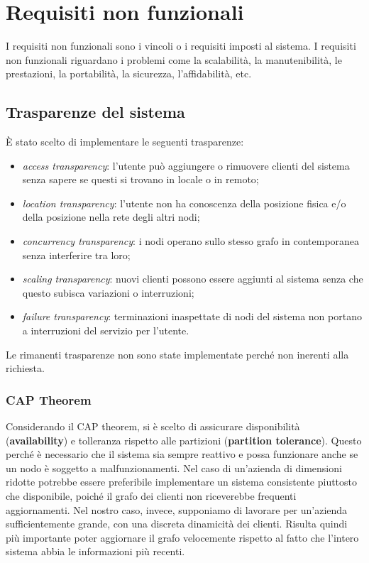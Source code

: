 \section{Requisiti non funzionali}\label{sec:non_functional}
I requisiti non funzionali sono i vincoli o i requisiti imposti al sistema. 
I requisiti non funzionali riguardano i problemi come la scalabilità, la manutenibilità, le prestazioni, la portabilità, la sicurezza, l'affidabilità, etc.

\subsection{Trasparenze del sistema}\label{sec:tra}
È stato scelto di implementare le seguenti trasparenze:
\begin{itemize}
    \item \textit{access transparency}: l'utente può aggiungere o rimuovere clienti del sistema senza sapere se questi si trovano in locale o in remoto;
    \item \textit{location transparency}: l'utente non ha conoscenza della posizione fisica e/o della posizione nella rete degli altri nodi;
    \item \textit{concurrency transparency}: i nodi operano sullo stesso grafo in contemporanea senza interferire tra loro;
    \item \textit{scaling transparency}: nuovi clienti possono essere aggiunti al sistema senza che questo subisca variazioni o interruzioni;
    \item \textit{failure transparency}: terminazioni inaspettate di nodi del sistema non portano a interruzioni del servizio per l'utente. 
\end{itemize}
Le rimanenti trasparenze non sono state implementate perché non inerenti alla richiesta.

\subsubsection{CAP Theorem}
Considerando il CAP theorem, si è scelto di assicurare disponibilità (\textbf{availability}) e tolleranza rispetto alle partizioni (\textbf{partition tolerance}).
Questo perché è necessario che il sistema sia sempre reattivo e possa funzionare anche se un nodo è soggetto a malfunzionamenti.
Nel caso di un'azienda di dimensioni ridotte potrebbe essere preferibile implementare un sistema consistente piuttosto che disponibile,
poiché il grafo dei clienti non riceverebbe frequenti aggiornamenti. Nel nostro caso, invece, supponiamo di lavorare per
un'azienda sufficientemente grande, con una discreta dinamicità dei clienti. Risulta quindi più importante poter aggiornare
il grafo velocemente rispetto al fatto che l'intero sistema abbia le informazioni più recenti.

